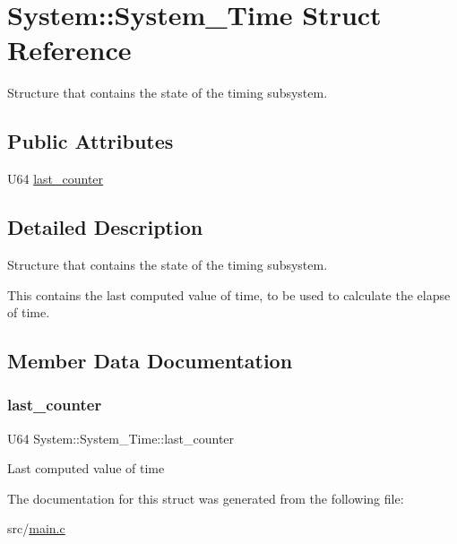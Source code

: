 \hypertarget{structSystem_1_1System__Time}{}\section{System\+::System\+\_\+\+Time Struct Reference}
\label{structSystem_1_1System__Time}


Structure that contains the state of the timing subsystem.  


\subsection*{Public Attributes}
\begin{DoxyCompactItemize}
\item 
U64 \mbox{\hyperlink{structSystem_1_1System__Time_ad772c765eb99ff55249b47b6677448af}{last\+\_\+counter}}
\end{DoxyCompactItemize}


\subsection{Detailed Description}
Structure that contains the state of the timing subsystem. 

This contains the last computed value of time, to be used to calculate the elapse of time. 

\subsection{Member Data Documentation}
\mbox{\label{structSystem_1_1System__Time_ad772c765eb99ff55249b47b6677448af}} 
\subsubsection{\texorpdfstring{last\_counter}{last\_counter}}
{\footnotesize\ttfamily U64 System\+::\+System\+\_\+\+Time\+::last\+\_\+counter}

Last computed value of time 

The documentation for this struct was generated from the following file\+:\begin{DoxyCompactItemize}
\item 
src/\mbox{\hyperlink{main_8c}{main.\+c}}\end{DoxyCompactItemize}
